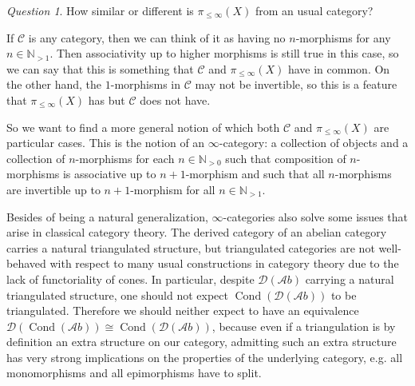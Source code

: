 \documentclass[11pt,A4]{article}
\theoremstyle{plain}
\theoremstyle{definition}
\theoremstyle{remark}
\newtheorem{q}[thm]{Question}
\newcommand{\N}{\mathbb{N}}
\newcommand{\C}{\mathscr{C}}
\newcommand{\Ab}{\mathscr{A}b}
\newcommand{\D}{\mathscr{D}}
\DeclareMathOperator{\Cond}{Cond}
\begin{document}
\begin{q}
    How similar or different is $\pi_{\leqslant \infty}(X)$ from an usual category?
\end{q}

If $\C$ is any category, then we can think of it as having no $n$-morphisms for any $n\in \N_{>1}$.
Then associativity up to higher morphisms is still true in this case, so we can say that this is something that $\C$ and $\pi_{\leqslant \infty }(X)$ have in common.
On the other hand, the $1$-morphisms in $\C$ may not be invertible, so this is a feature that $\pi_{\leqslant \infty}(X)$ has but $\C$ does not have.

So we want to find a more general notion of which both $\C$ and $\pi_{\leqslant \infty}(X)$ are particular cases.
This is the notion of an $\infty$-category: a collection of objects and a collection of $n$-morphisms for each $n\in \N_{>0}$ such that composition of $n$-morphisms is associative up to $n+1$-morphism and such that all $n$-morphisms are invertible up to $n+1$-morphism for all $n\in\N_{>1}$.

Besides of being a natural generalization, $\infty$-categories also solve some issues that arise in classical category theory.
The derived category of an abelian category carries a natural triangulated structure, but triangulated categories are not well-behaved with respect to many usual constructions in category theory due to the lack of functoriality of cones.
In particular, despite $\D(\Ab)$ carrying a natural triangulated structure, one should not expect $\Cond(\D(\Ab))$ to be triangulated.
Therefore we should neither expect to have an equivalence $\D(\Cond(\Ab))\cong \Cond(\D(\Ab))$, because even if a triangulation is by definition an extra structure on our category, admitting such an extra structure has very strong implications on the properties of the underlying category, e.g. all monomorphisms and all epimorphisms have to split.





\end{document}
